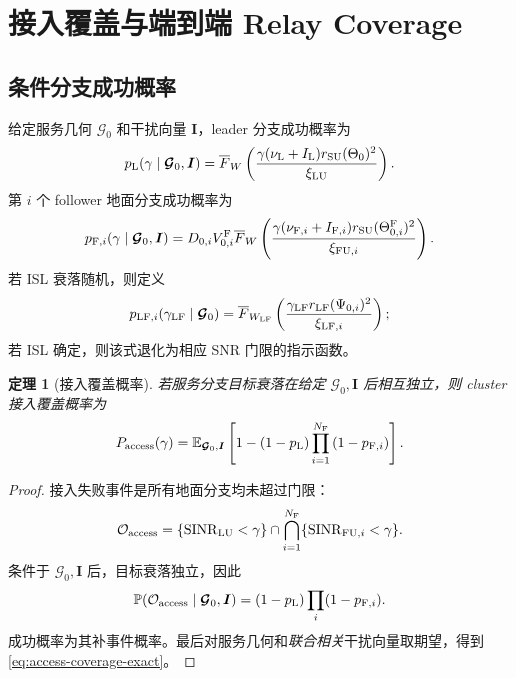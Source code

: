 \documentclass[UTF8,a4paper,11pt]{ctexart}
\newtheorem{theorem}{定理}[section]
\newcommand{\E}{\mathbb E}
\newcommand{\Prob}{\mathbb P}
\newcommand{\NF}{N_{\mathrm F}}
\newcommand{\SINR}{\operatorname{SINR}}
\newcommand{\Pa}{P_{\mathrm{access}}}
\newcommand{\Ivec}{\bm I}
\newcommand{\Gvec}{\bm{\mathcal G}}
\begin{document}
\section{接入覆盖与端到端 Relay Coverage}

\subsection{条件分支成功概率}

给定服务几何 $\Gvec_0$ 和干扰向量 $\Ivec$，leader 分支成功概率为
\begin{equation}
 p_{\rm L}(\gamma\mid\Gvec_0,\Ivec)
 =
 \overline F_W\left(
 \frac{\gamma(\nu_{\rm L}+I_{\rm L})r_{\rm SU}(\Theta_0)^2}
 {\xi_{\rm LU}}
 \right).
 \label{eq:conditional-leader-success}
\end{equation}
第 $i$ 个 follower 地面分支成功概率为
\begin{equation}
 p_{{\rm F},i}(\gamma\mid\Gvec_0,\Ivec)
 =
 D_{0,i}V_{0,i}^{\rm F}
 \overline F_W\left(
 \frac{\gamma(\nu_{{\rm F},i}+I_{{\rm F},i})
 r_{\rm SU}(\Theta_{0,i}^{\rm F})^2}
 {\xi_{{\rm FU},i}}
 \right).
 \label{eq:conditional-follower-success}
\end{equation}
若 ISL 衰落随机，则定义
\begin{equation}
 p_{{\rm LF},i}(\gamma_{\rm LF}\mid\Gvec_0)
 =
 \overline F_{W_{\rm LF}}\left(
 \frac{\gamma_{\rm LF}r_{\rm LF}(\Psi_{0,i})^2}
 {\xi_{{\rm LF},i}}
 \right);
 \label{eq:conditional-lf-success}
\end{equation}
若 ISL 确定，则该式退化为相应 SNR 门限的指示函数。

\begin{theorem}[接入覆盖概率]
\label{thm:access-coverage}
若服务分支目标衰落在给定 $\Gvec_0,\Ivec$ 后相互独立，则 cluster 接入覆盖概率为
\begin{equation}
 \Pa(\gamma)
 =
 \E_{\Gvec_0,\Ivec}
 \left[
 1-
 \left(1-p_{\rm L}\right)
 \prod_{i=1}^{\NF}
 \left(1-p_{{\rm F},i}\right)
 \right].
 \label{eq:access-coverage-exact}
\end{equation}
\end{theorem}

\begin{proof}
接入失败事件是所有地面分支均未超过门限：
\begin{equation}
 \mathcal O_{\rm access}
 =
 \{\SINR_{\rm LU}<\gamma\}
 \cap
 \bigcap_{i=1}^{\NF}
 \{\SINR_{{\rm FU},i}<\gamma\}.
\end{equation}
条件于 $\Gvec_0,\Ivec$ 后，目标衰落独立，因此
\begin{equation}
 \Prob(\mathcal O_{\rm access}\mid\Gvec_0,\Ivec)
 =
 (1-p_{\rm L})\prod_i(1-p_{{\rm F},i}).
\end{equation}
成功概率为其补事件概率。最后对服务几何和\emph{联合相关}干扰向量取期望，得到
\eqref{eq:access-coverage-exact}。
\end{proof}
\end{document}
